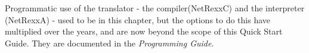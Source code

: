 





Programmatic use of the translator - the compiler(NetRexxC) and the
interpreter (NetRexxA) - used to be in this chapter, but the options
to do this have multiplied over the years, and are now beyond the scope
of this Quick Start Guide. They are documented in the \emph{Programming Guide}.